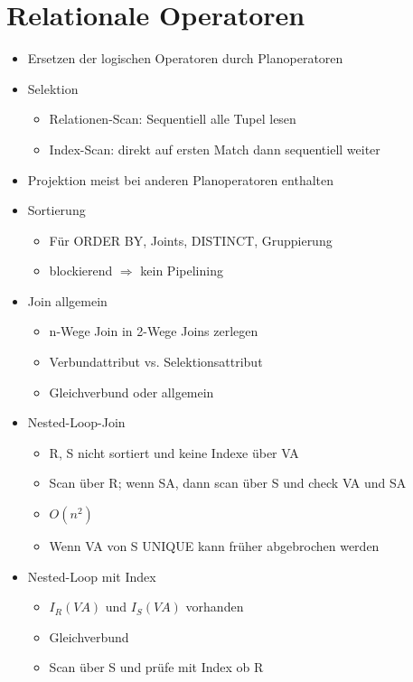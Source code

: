 \documentclass[11pt, paper=a4, twocolumn]{scrartcl}
\begin{document}
	\section{Relationale Operatoren}
		\begin{itemize}
			\item Ersetzen der logischen Operatoren durch Planoperatoren
			\item Selektion
				\begin{itemize}
					\item Relationen-Scan: Sequentiell alle Tupel 
						lesen
					\item Index-Scan: direkt auf ersten Match dann 
						sequentiell weiter
				\end{itemize}
			\item Projektion meist bei anderen Planoperatoren enthalten
			\item Sortierung
				\begin{itemize}
					\item Für ORDER BY, Joints, DISTINCT, Gruppierung
					\item blockierend $\Rightarrow$ kein Pipelining
				\end{itemize}
			\item Join allgemein
				\begin{itemize}
					\item n-Wege Join in 2-Wege Joins zerlegen
					\item Verbundattribut vs. Selektionsattribut
					\item Gleichverbund oder allgemein
				\end{itemize} 
			\item Nested-Loop-Join
				\begin{itemize}
					\item R, S nicht sortiert und keine Indexe über VA
					\item Scan über R; wenn SA, dann scan über S und 
						check VA und SA
					\item $O(n^2)$
					\item Wenn VA von S UNIQUE kann früher abgebrochen 
						werden
				\end{itemize}
			\item Nested-Loop mit Index
				\begin{itemize}
					\item $I_R(VA)$ und $I_S(VA)$ vorhanden
					\item Gleichverbund
					\item Scan über S und prüfe mit Index ob R 

\end{itemize}
\end{itemize}
\end{document}
